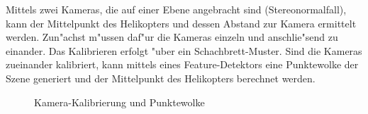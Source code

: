 \noindent Mittels zwei Kameras, die auf einer Ebene angebracht sind (Stereonormalfall), kann der Mittelpunkt des Helikopters und dessen Abstand zur Kamera ermittelt werden.\newline
Zun"achst m"ussen daf"ur die Kameras einzeln und anschlie"send zu einander. Das Kalibrieren erfolgt "uber ein Schachbrett-Muster. Sind die Kameras zueinander kalibriert, kann mittels eines Feature-Detektors eine Punktewolke der Szene generiert und der Mittelpunkt des Helikopters berechnet werden.

\begin{figure}%
	\centering
	\qquad
	\caption{Kamera-Kalibrierung und Punktewolke}%
	\label{fig:extendetabstract}%
\end{figure}

